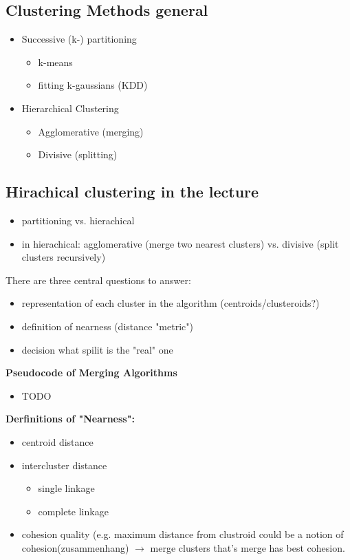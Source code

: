 \documentclass[]{article}
\begin{document}
\subsection{Clustering Methods general}
\begin{itemize}
\item Successive  (k-) partitioning
	\begin{itemize}
	\item k-means
	\item fitting k-gaussians (KDD)
	\end{itemize}
\item Hierarchical Clustering
	\begin{itemize}
	\item Agglomerative (merging)
	\item Divisive (splitting)
	\end{itemize}
\end{itemize}

\subsection{Hirachical clustering in the lecture}
\begin{itemize}
\item partitioning vs. hierachical
\item in hierachical: agglomerative (merge two nearest clusters) vs. divisive (split clusters recursively)
\end{itemize}
There are three central questions to answer:
\begin{itemize}
\item representation of each cluster in the algorithm (centroids/clusteroids?)
\item definition of nearness (distance "metric")
\item decision what spilit is the "real" one
\end{itemize}
\textbf{Pseudocode of Merging Algorithms}
\begin{itemize}
\item TODO
\end{itemize}
\textbf{Derfinitions of "Nearness":}
\begin{itemize}
\item centroid distance
\item intercluster distance
	\begin{itemize}
	\item single linkage
	\item complete linkage
	\end{itemize}
\item cohesion quality (e.g. maximum distance from clustroid could be a notion of cohesion(zusammenhang) $\rightarrow$ merge clusters that's merge has best cohesion.
\end{itemize}
\end{document}
